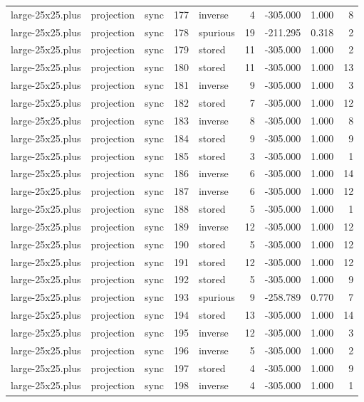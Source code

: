 \begin{tabular}{lllrlrrrr}
large-25x25.plus & projection & sync & 177 & inverse & 4 & -305.000 & 1.000 & 8 \\
large-25x25.plus & projection & sync & 178 & spurious & 19 & -211.295 & 0.318 & 2 \\
large-25x25.plus & projection & sync & 179 & stored & 11 & -305.000 & 1.000 & 2 \\
large-25x25.plus & projection & sync & 180 & stored & 11 & -305.000 & 1.000 & 13 \\
large-25x25.plus & projection & sync & 181 & inverse & 9 & -305.000 & 1.000 & 3 \\
large-25x25.plus & projection & sync & 182 & stored & 7 & -305.000 & 1.000 & 12 \\
large-25x25.plus & projection & sync & 183 & inverse & 8 & -305.000 & 1.000 & 8 \\
large-25x25.plus & projection & sync & 184 & stored & 9 & -305.000 & 1.000 & 9 \\
large-25x25.plus & projection & sync & 185 & stored & 3 & -305.000 & 1.000 & 1 \\
large-25x25.plus & projection & sync & 186 & inverse & 6 & -305.000 & 1.000 & 14 \\
large-25x25.plus & projection & sync & 187 & inverse & 6 & -305.000 & 1.000 & 12 \\
large-25x25.plus & projection & sync & 188 & stored & 5 & -305.000 & 1.000 & 1 \\
large-25x25.plus & projection & sync & 189 & inverse & 12 & -305.000 & 1.000 & 12 \\
large-25x25.plus & projection & sync & 190 & stored & 5 & -305.000 & 1.000 & 12 \\
large-25x25.plus & projection & sync & 191 & stored & 12 & -305.000 & 1.000 & 12 \\
large-25x25.plus & projection & sync & 192 & stored & 5 & -305.000 & 1.000 & 9 \\
large-25x25.plus & projection & sync & 193 & spurious & 9 & -258.789 & 0.770 & 7 \\
large-25x25.plus & projection & sync & 194 & stored & 13 & -305.000 & 1.000 & 14 \\
large-25x25.plus & projection & sync & 195 & inverse & 12 & -305.000 & 1.000 & 3 \\
large-25x25.plus & projection & sync & 196 & inverse & 5 & -305.000 & 1.000 & 2 \\
large-25x25.plus & projection & sync & 197 & stored & 4 & -305.000 & 1.000 & 9 \\
large-25x25.plus & projection & sync & 198 & inverse & 4 & -305.000 & 1.000 & 1 \\

\end{tabular}
